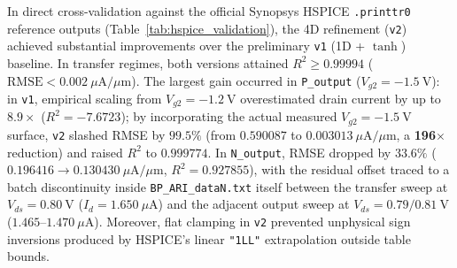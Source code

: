 In direct cross-validation against the official Synopsys HSPICE \texttt{.printtr0} reference outputs (Table~\ref{tab:hspice_validation}), the 4D refinement (\texttt{v2}) achieved substantial improvements over the preliminary \texttt{v1} (1D + $\tanh$) baseline. In transfer regimes, both versions attained $R^2 \ge 0.99994$ ($\text{RMSE} < 0.002\ \mu\text{A}/\mu\text{m}$). The largest gain occurred in \texttt{P\_output} ($V_{g2} = -1.5\ \text{V}$): in \texttt{v1}, empirical scaling from $V_{g2}=-1.2\ \text{V}$ overestimated drain current by up to $8.9\times$ ($R^2 = -7.6723$); by incorporating the actual measured $V_{g2}=-1.5\ \text{V}$ surface, \texttt{v2} slashed RMSE by $99.5\%$ (from $0.590087$ to $0.003013\ \mu\text{A}/\mu\text{m}$, a \textbf{196$\times$} reduction) and raised $R^2$ to $0.999774$. In \texttt{N\_output}, RMSE dropped by $33.6\%$ ($0.196416 \to 0.130430\ \mu\text{A}/\mu\text{m}$, $R^2 = 0.927855$), with the residual offset traced to a batch discontinuity inside \texttt{BP\_ARI\_dataN.txt} itself between the transfer sweep at $V_{ds}=0.80\ \text{V}$ ($I_d = 1.650\ \mu\text{A}$) and the adjacent output sweep at $V_{ds}=0.79/0.81\ \text{V}$ ($1.465\text{--}1.470\ \mu\text{A}$). Moreover, flat clamping in \texttt{v2} prevented unphysical sign inversions produced by HSPICE's linear \texttt{"1LL"} extrapolation outside table bounds.

\begin{table}[htbp]
\centering
\caption{Quantitative cross-validation between \texttt{ngspice-47} (\texttt{v1} and \texttt{v2}) and HSPICE \texttt{.printtr0} outputs.}
\label{tab:hspice_validation}
\end{table}

